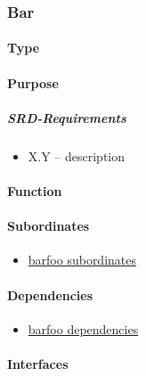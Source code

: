 \subsubsection{Bar} %
\label{component:bar}

\paragraph{Type} %
\label{par:type}


\paragraph{Purpose} %
\label{par:purpose}
\subparagraph{SRD-Requirements}
  \begin{itemize}
    \item X.Y -- description
  \end{itemize}

\paragraph{Function} %
\label{par:function}


\paragraph{Subordinates} %
\label{par:subordinates}
\begin{itemize}
	\item \hyperref[component:subord]{barfoo subordinates}
\end{itemize}

\paragraph{Dependencies} %
\label{par:dependencies}
  \begin{itemize}
    \item \hyperref[component:dependencies]{barfoo dependencies}
  \end{itemize}


\paragraph{Interfaces} %
\label{par:interfaces}

